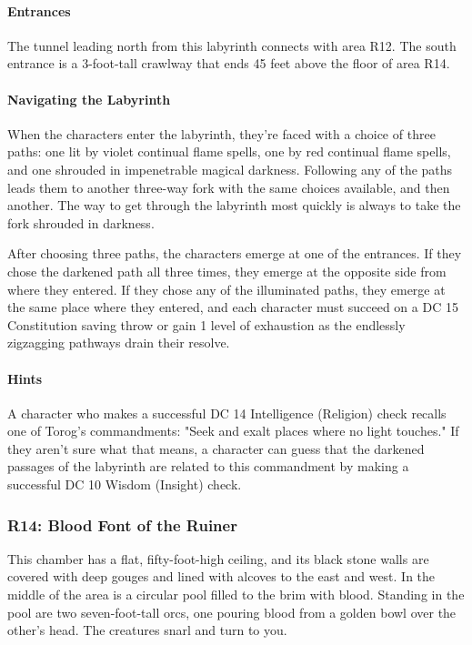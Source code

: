 \documentclass[10pt,a4paper,twoside,bg=print,twocolumn,openany,nodeprecatedcode]{dndbook}
\begin{document}
\paragraph{Entrances}
The tunnel leading north from this labyrinth connects with area R12. The south entrance is a 3-foot-tall crawlway that ends 45 feet above the floor of area R14.

\paragraph{Navigating the Labyrinth}
When the characters enter the labyrinth, they're faced with a choice of three paths: one lit by violet continual flame spells, one by red continual flame spells, and one shrouded in impenetrable magical darkness. Following any of the paths leads them to another three-way fork with the same choices available, and then another. The way to get through the labyrinth most quickly is always to take the fork shrouded in darkness.

After choosing three paths, the characters emerge at one of the entrances. If they chose the darkened path all three times, they emerge at the opposite side from where they entered. If they chose any of the illuminated paths, they emerge at the same place where they entered, and each character must succeed on a DC 15 Constitution saving throw or gain 1 level of exhaustion as the endlessly zigzagging pathways drain their resolve.

\paragraph{Hints}
A character who makes a successful DC 14 Intelligence (Religion) check recalls one of Torog's commandments: "Seek and exalt places where no light touches." If they aren't sure what that means, a character can guess that the darkened passages of the labyrinth are related to this commandment by making a successful DC 10 Wisdom (Insight) check.

\subsubsection{R14: Blood Font of the Ruiner}
\begin{DndReadAloud}{}
This chamber has a flat, fifty-foot-high ceiling, and its black stone walls are covered with deep gouges and lined with alcoves to the east and west. In the middle of the area is a circular pool filled to the brim with blood. Standing in the pool are two seven-foot-tall orcs, one pouring blood from a golden bowl over the other's head. The creatures snarl and turn to you.

\end{DndReadAloud}
\end{document}

